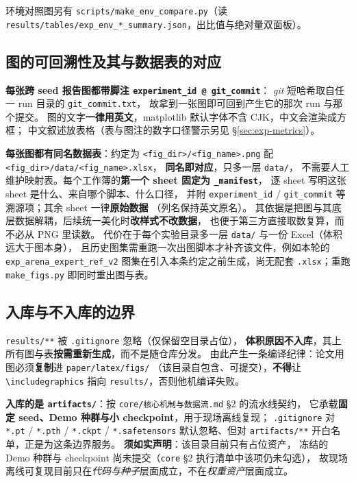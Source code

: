 {\footnotesize 环境对照图另有 \texttt{scripts/make\_env\_compare.py}（读
\texttt{results/tables/exp\_env\_*\_summary.json}，出比值与绝对量双面板）。}

\subsection{图的可回溯性及其与数据表的对应}

\textbf{每张跨 seed 报告图都带脚注 \texttt{experiment\_id @ git\_commit}}：
\emph{git} 短哈希取自任一 run 目录的 \texttt{git\_commit.txt}，
故拿到一张图即可回到产生它的那次 run 与那个提交。
图的文字\textbf{一律用英文}，matplotlib 默认字体不含 CJK，中文会渲染成方框；
中文叙述放表格（表与图注的数字口径警示另见 \S\ref{sec:exp-metrics}）。

\textbf{每张图都有同名数据表}：约定为
\texttt{<fig\_dir>/<fig\_name>.png} 配 \texttt{<fig\_dir>/data/<fig\_name>.xlsx}，
\textbf{同名即对应}，只多一层 \texttt{data/}，
不需要人工维护映射表。每个工作簿的\textbf{第一个 sheet 固定为 \texttt{\_manifest}}，
逐 sheet 写明这张 sheet 是什么、来自哪个脚本、什么口径，
并附 \texttt{experiment\_id} / \texttt{git\_commit} 等溯源项；其余 sheet 一律\textbf{原始数据}
（列名保持英文原名）。
其依据是把图与其底层数据解耦，后续统一美化时\textbf{改样式不改数据}，
也便于第三方直接取数复算，而不必从 PNG 里读数。
代价在于每个实验目录多一层 \texttt{data/} 与一份 Excel（体积远大于图本身），
且历史图集需重跑一次出图脚本才补齐该文件，例如本轮的
\texttt{exp\_arena\_expert\_ref\_v2} 图集在引入本条约定之前生成，尚无配套
\texttt{.xlsx}；重跑 \texttt{make\_figs.py} 即同时重出图与表。

\subsection{入库与不入库的边界}

\texttt{results/**} 被 \texttt{.gitignore} 忽略（仅保留空目录占位），
\textbf{体积原因不入库}，其上所有图与表\textbf{按需重新生成}，而不是随仓库分发。
由此产生一条编译纪律：论文用图必须\textbf{复制}进 \texttt{paper/latex/figs/}
（该目录自包含、可提交），\textbf{不得}让 \texttt{\textbackslash includegraphics}
指向 \texttt{results/}，否则他机编译失败。

\textbf{入库的是 \texttt{artifacts/}}：按 \texttt{core/核心机制与数据流.md} \S2 的流水线契约，
它承载\textbf{固定 seed、Demo 种群与小 checkpoint}，用于现场离线复现；
\texttt{.gitignore} 对 \texttt{*.pt} / \texttt{*.pth} / \texttt{*.ckpt} / \texttt{*.safetensors}
默认忽略、但对 \texttt{artifacts/**} 开白名单，正是为这条边界服务。
\textbf{须如实声明}：该目录目前只有占位资产，
冻结的 Demo 种群与 checkpoint 尚未提交（\texttt{core} \S2 执行清单中该项仍未勾选），
故现场离线可复现目前只在\emph{代码与种子}层面成立，不在\emph{权重资产}层面成立。

